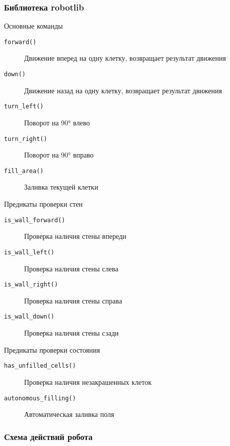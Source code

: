 \documentclass[14pt]{beamer}
\begin{document}
\begin{frame}
\frametitle{Библиотека robotlib}
\begin{block}{Основные команды}
\begin{description}
\item[\texttt{forward()}] Движение вперед на одну клетку, возвращает результат движения
\item[\texttt{down()}] Движение назад на одну клетку, возвращает результат движения
\item[\texttt{turn\_left()}] Поворот на 90° влево
\item[\texttt{turn\_right()}] Поворот на 90° вправо
\item[\texttt{fill\_area()}] Заливка текущей клетки
\end{description}
\end{block}

\begin{block}{Предикаты проверки стен}
\begin{description}
\item[\texttt{is\_wall\_forward()}] Проверка наличия стены впереди
\item[\texttt{is\_wall\_left()}] Проверка наличия стены слева
\item[\texttt{is\_wall\_right()}] Проверка наличия стены справа
\item[\texttt{is\_wall\_down()}] Проверка наличия стены сзади
\end{description}
\end{block}

\begin{block}{Предикаты проверки состояния}
\begin{description}
\item[\texttt{has\_unfilled\_cells()}] Проверка наличия незакрашенных клеток
\item[\texttt{autonomous\_filling()}] Автоматическая заливка поля
\end{description}
\end{block}
\end{frame}

\begin{frame}
\frametitle{Схема действий робота}
\begin{center}
\end{center}
\end{frame}
\end{document}

